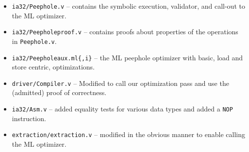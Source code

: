 \documentclass{article}
\begin{document}
\begin{itemize}
\item {\tt ia32/Peephole.v} -- contains the symbolic execution,
  validator, and call-out to the ML optimizer.
\item {\tt ia32/Peepholeproof.v} -- contains proofs about
  properties of the operations in {\tt Peephole.v}.
\item {\tt ia32/Peepholeaux.ml\{,i\}} -- the ML peephole
  optimizer with basic, load and store centric, optimizations.
\item {\tt driver/Compiler.v} -- Modified to call our
  optimization pass and use the (admitted) proof of correctness.
\item {\tt ia32/Asm.v} -- added equality tests for various data
  types and added a {\tt NOP} instruction.
\item {\tt extraction/extraction.v} -- modified in the obvious
  manner to enable calling the ML optimizer.
\end{itemize}
\end{document}
